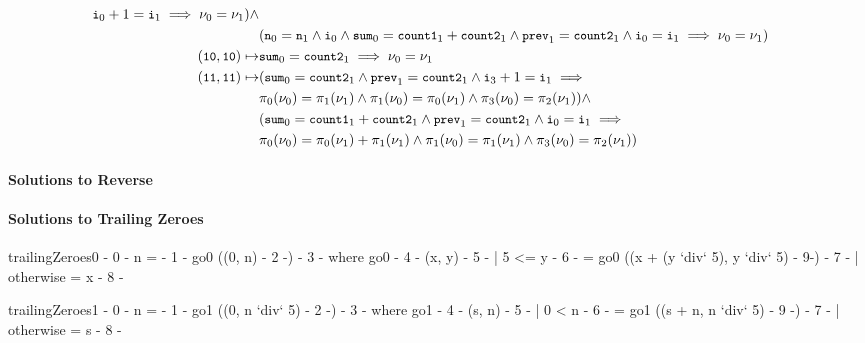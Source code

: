 \begin{align*}
  \cc{i}_0 + 1 = \cc{i}_1 \implies %
  \nu_0 = \nu_1) \land \\
  & (\cc{n}_0 = \cc{n}_1 \land \cc{i}_0 \land %
  \cc{sum}_0 = \cc{count1}_1 + \cc{count2}_1 \land %
  \cc{prev}_1 = \cc{count2}_1 \land %
  \cc{i}_0 = \cc{i}_1 \implies %
  \nu_0 = \nu_1) \\
  (\cc{10}, \cc{10}) \mapsto & \cc{sum}_0 = \cc{count2}_1 \implies %
  \nu_0 = \nu_1 \\
  (\cc{11}, \cc{11}) \mapsto & 
  (\cc{sum}_0 = \cc{count2}_1 \land %
  \cc{prev}_1 = \cc{count2}_1 \land %
  \cc{i}_3 + 1 = \cc{i}_1 \implies \\
  & \pi_0(\nu_0) = \pi_1(\nu_1) \land %
  \pi_1(\nu_0) = \pi_0(\nu_1) \land %
  \pi_3(\nu_0) = \pi_2(\nu_1)) \land \\
  & (\cc{sum}_0 = \cc{count1}_1 + \cc{count2}_1 \land %
  \cc{prev}_1 = \cc{count2}_1 \land %
  \cc{i}_0 = \cc{i}_1 \implies \\ %
  & \pi_0(\nu_0) = \pi_0(\nu_1) + \pi_1(\nu_1) \land %
  \pi_1(\nu_0) = \pi_1(\nu_1) \land %
  \pi_3(\nu_0) = \pi_2(\nu_1)) \\
\end{align*}
%
%



\paragraph{Solutions to Reverse}
%

\paragraph{Solutions to Trailing Zeroes}
\begin{hcode}
trailingZeroes0 {- 0 -} n 
 = {- 1 -} go0 ((0, n) {- 2 -}) {- 3 -}
  where
    go0 {- 4 -} (x, y) {- 5 -}
      | 5 <= y  {- 6 -}
      = go0 ((x + (y `div` 5), y `div` 5) {- 9-}) {- 7 -}
      | otherwise 
      = x {- 8 -}


trailingZeroes1 {- 0 -} n 
 = {- 1 -} go1 ((0, n `div` 5) {- 2 -}) {- 3 -}
  where 
    go1 {- 4 -} (s, n) {- 5 -}
      | 0 < n   {- 6 -} 
      = go1 ((s + n, n `div` 5) {- 9 -}) {- 7 -}
      | otherwise 
      = s {- 8 -}
\end{hcode}


